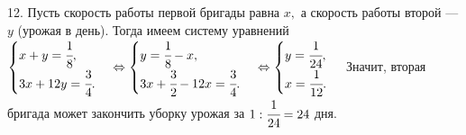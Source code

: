 12. Пусть скорость работы первой бригады равна $x,$ а скорость работы второй --- $y$ (урожая в день). Тогда имеем систему уравнений
$\begin{cases} x+y=\cfrac{1}{8},\\ 3x+12y=\cfrac{3}{4}.\end{cases}
\Leftrightarrow \begin{cases} y=\cfrac{1}{8}-x,\\ 3x+\cfrac{3}{2}-12x=\cfrac{3}{4}.\end{cases}
\Leftrightarrow \begin{cases} y=\cfrac{1}{24},\\ x=\cfrac{1}{12}.\end{cases}$
Значит, вторая бригада может закончить уборку урожая за $1:\cfrac{1}{24}=24$ дня.\\
